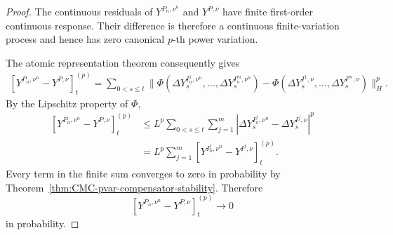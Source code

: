 \documentclass[a4paper,10pt]{article}
\begin{document}
\begin{proof}
The continuous residuals of \(Y^{P_n,\nu^n}\) and \(Y^{P,\nu}\)
have finite first-order continuous response. Their difference is
therefore a continuous finite-variation process and hence has zero
canonical \(p\)-th power variation.

The atomic representation theorem consequently gives
\[
\begin{aligned}
[Y^{P_n,\nu^n}-Y^{P,\nu}]^{(p)}_t
=
\sum_{0<s\le t}
\lVert
\Phi\left(
        \Delta Y_s^{I_n^1,\nu^n},
        \ldots,
        \Delta Y_s^{I_n^m,\nu^n}
\right)
-
\Phi\left(
        \Delta Y_s^{I^1,\nu},
        \ldots,
        \Delta Y_s^{I^m,\nu}
\right)
\rVert_H^p.
\end{aligned}
\]
By the Lipschitz property of \(\Phi\),
\[
\begin{aligned}
[Y^{P_n,\nu^n}-Y^{P,\nu}]^{(p)}_t
&\le
L^p
\sum_{0<s\le t}
\sum_{j=1}^m
\left|
        \Delta Y_s^{I_n^j,\nu^n}
        -
        \Delta Y_s^{I^j,\nu}
\right|^p
\\
&=
L^p
\sum_{j=1}^m
\left[
        Y^{I_n^j,\nu^n}-Y^{I^j,\nu}
\right]^{(p)}_t.
\end{aligned}
\]
Every term in the finite sum converges to zero in probability by
Theorem~\ref{thm:CMC-pvar-compensator-stability}. Therefore
\[
        [Y^{P_n,\nu^n}-Y^{P,\nu}]^{(p)}_t
        \longrightarrow0
\]
in probability.
\end{proof}
\end{document}
